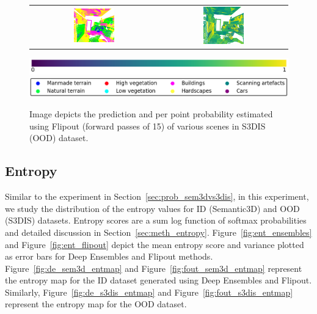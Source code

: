 \begin{figure}[h!]
\begin{tabular}{cc}
            \includegraphics[width=0.33\textwidth, height=0.18\textheight]{images/seg_output/s3dis_DE/office_42.pdf}& 
            \includegraphics[width=0.33\textwidth, height=0.18\textheight]{images/seg_output/s3dis_DE/fout_4.png}\\
        \end{tabular}
        \includegraphics[scale=0.45]{images/prob_legend.pdf}
        \includegraphics[scale=0.45]{images/legend.png}
        \caption{Image depicts the prediction and per point probability estimated using Flipout (forward passes of 15) of various scenes in S3DIS (OOD) dataset.}
        \label{fig:fout_s3dis_probmap}
    \end{figure}


    \FloatBarrier
    \subsection{Entropy}
    \label{sec:ent_sem3dvs3dis}

    Similar to the experiment in Section~\ref{sec:prob_sem3dvs3dis}, in this experiment, we study the distribution of the entropy values for ID (Semantic3D) and OOD (S3DIS) datasets.
    Entropy scores are a sum log function of softmax probabilities and detailed discussion in Section~\ref{sec:meth_entropy}.
    Figure~\ref{fig:ent_ensembles} and Figure~\ref{fig:ent_flipout} depict the mean entropy score and variance plotted as error bars for Deep Ensembles and Flipout methods.    
    Figure~\ref{fig:de_sem3d_entmap} and Figure~\ref{fig:fout_sem3d_entmap} represent the entropy map for the ID dataset generated using Deep Ensembles and Flipout.
    Similarly, Figure~\ref{fig:de_s3dis_entmap} and Figure~\ref{fig:fout_s3dis_entmap} represent the entropy map for the OOD dataset.

